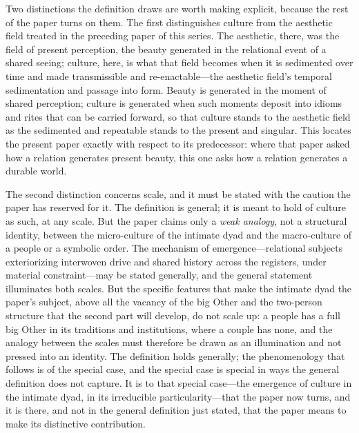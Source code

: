 Two distinctions the definition draws are worth making explicit, because the rest of the paper turns on them. The first distinguishes culture from the aesthetic field treated in the preceding paper of this series. The aesthetic, there, was the field of present perception, the beauty generated in the relational event of a shared seeing; culture, here, is what that field becomes when it is sedimented over time and made transmissible and re-enactable---the aesthetic field's temporal sedimentation and passage into form. Beauty is generated in the moment of shared perception; culture is generated when such moments deposit into idioms and rites that can be carried forward, so that culture stands to the aesthetic field as the sedimented and repeatable stands to the present and singular. This locates the present paper exactly with respect to its predecessor: where that paper asked how a relation generates present beauty, this one asks how a relation generates a durable world.

The second distinction concerns scale, and it must be stated with the caution the paper has reserved for it. The definition is general; it is meant to hold of culture as such, at any scale. But the paper claims only a \emph{weak analogy}, not a structural identity, between the micro-culture of the intimate dyad and the macro-culture of a people or a symbolic order. The mechanism of emergence---relational subjects exteriorizing interwoven drive and shared history across the registers, under material constraint---may be stated generally, and the general statement illuminates both scales. But the specific features that make the intimate dyad the paper's subject, above all the vacancy of the big Other and the two-person structure that the second part will develop, do not scale up: a people has a full big Other in its traditions and institutions, where a couple has none, and the analogy between the scales must therefore be drawn as an illumination and not pressed into an identity. The definition holds generally; the phenomenology that follows is of the special case, and the special case is special in ways the general definition does not capture. It is to that special case---the emergence of culture in the intimate dyad, in its irreducible particularity---that the paper now turns, and it is there, and not in the general definition just stated, that the paper means to make its distinctive contribution.
